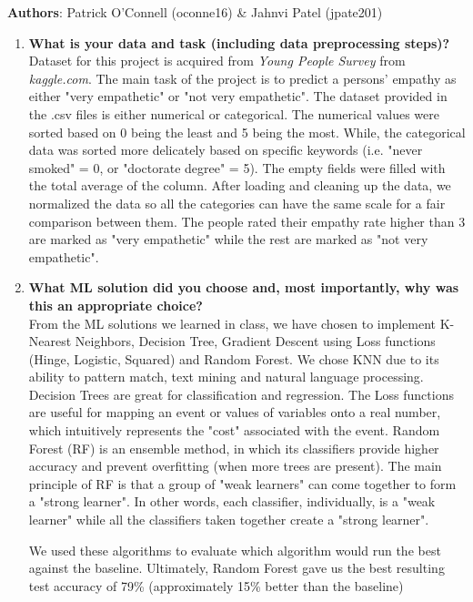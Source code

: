 \documentclass[5px]{report}
\begin{document}
\textbf{Authors}: Patrick O'Connell (oconne16) \& Jahnvi Patel (jpate201)
\begin{enumerate}
\item \textbf{What is your data and task (including data preprocessing steps)?} \\
Dataset for this project is acquired from \textit{Young People Survey} from \textit{kaggle.com}. The main task of the project is to predict a persons' empathy as either "very empathetic" or "not very empathetic". The dataset provided in the .csv files is either numerical or categorical. The numerical values were sorted based on 0 being the least and 5 being the most. While, the categorical data was sorted more delicately based on specific keywords (i.e. "never smoked" = 0, or "doctorate degree" = 5). The empty fields were filled with the total average of the column. After loading and cleaning up the data, we normalized the data so all the categories can have the same scale for a fair comparison between them. The people rated their empathy rate higher than 3 are marked as "very empathetic" while the rest are marked as "not very empathetic". 

\item \textbf{What ML solution did you choose and, most importantly, why was this an appropriate choice?}\\
From the ML solutions we learned in class, we have chosen to implement K-Nearest Neighbors, Decision Tree, Gradient Descent using Loss functions (Hinge, Logistic, Squared) and Random Forest. We chose KNN due to its ability to pattern match, text mining and natural language processing. Decision Trees are great for classification and regression. The Loss functions are useful for mapping an event or values of variables onto a real number, which intuitively represents the "cost" associated with the event. Random Forest (RF) is an ensemble method, in which its classifiers provide higher accuracy and prevent overfitting (when more trees are present). The main principle of RF is that a group of "weak learners" can come together to form a "strong learner". In other words, each classifier, individually, is a "weak learner" while all the classifiers taken together create a "strong learner". 

We used these algorithms to evaluate which algorithm would run the best against the baseline. Ultimately, Random Forest gave us the best resulting test accuracy of 79\% (approximately 15\% better than the baseline) 


\end{enumerate}
\end{document}

